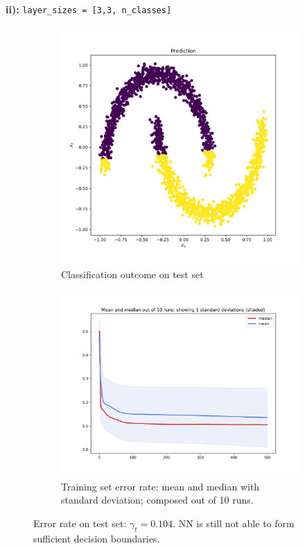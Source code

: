 \documentclass[12pt]{article}
\begin{document}
\newline
\textbf{ii):} \texttt{layer\_sizes = [3,3, n\_classes]} \\
\begin{figure}[h!]
\captionsetup[subfigure]{labelformat=empty}
\centering
	\begin{subfigure}{.48\textwidth}
	\centering
	\includegraphics[scale=0.3]{pics/Prediction_ii}
	\caption{Classification outcome on test set}
	\label{fig:ii_a}
	\end{subfigure}
	\begin{subfigure}{.48\textwidth}
	\centering
	\includegraphics[scale=0.3]{pics/ii_ens}
	\caption{Training set error rate: mean and median with standard deviation; composed out of 10 runs.}
	\label{fig:ii_b}
	\end{subfigure}
\caption{Error rate on test set: $\gamma_t = 0.104$. NN is still not able to form sufficient decision boundaries.}
\label{fig:res_ii}
\end{figure}
\end{document}
